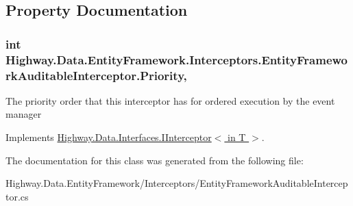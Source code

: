 \subsection{Property Documentation}
\hypertarget{class_highway_1_1_data_1_1_entity_framework_1_1_interceptors_1_1_entity_framework_auditable_interceptor_a49eb8fc89f9eb1b4103f29d4f4c45d6b}{
\subsubsection[{Priority}]{\setlength{\rightskip}{0pt plus 5cm}int Highway.\-Data.\-Entity\-Framework.\-Interceptors.\-Entity\-Framework\-Auditable\-Interceptor.\-Priority\hspace{0.3cm}{\ttfamily [get]}, {\ttfamily [set]}}}\label{class_highway_1_1_data_1_1_entity_framework_1_1_interceptors_1_1_entity_framework_auditable_interceptor_a49eb8fc89f9eb1b4103f29d4f4c45d6b}


The priority order that this interceptor has for ordered execution by the event manager 



Implements \hyperlink{interface_highway_1_1_data_1_1_interfaces_1_1_i_interceptor-g_a7d04e39fcc9ecb1139044cbdda2df23a}{Highway.\-Data.\-Interfaces.\-I\-Interceptor$<$ in T $>$}.



The documentation for this class was generated from the following file\-:\begin{DoxyCompactItemize}
\item 
Highway.\-Data.\-Entity\-Framework/\-Interceptors/Entity\-Framework\-Auditable\-Interceptor.\-cs\end{DoxyCompactItemize}
